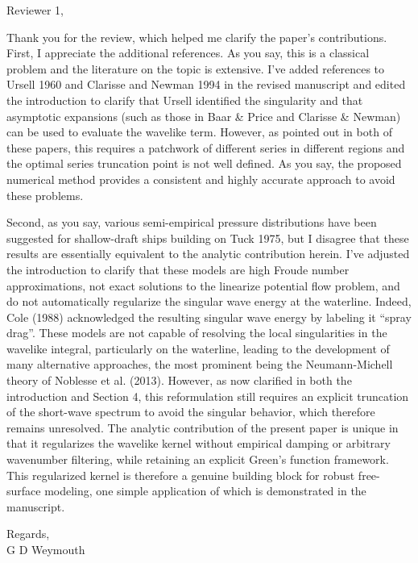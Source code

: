 \documentclass[12pt]{letter}
\begin{document}
Reviewer 1, 

Thank you for the review, which helped me clarify the paper's contributions. First, I appreciate the additional references. As you say, this is a classical problem and the literature on the topic is extensive. I've added references to Ursell 1960 and Clarisse and Newman 1994 in the revised manuscript and edited the introduction to clarify that Ursell identified the singularity and that asymptotic expansions (such as those in Baar \& Price and Clarisse \& Newman) can be used to evaluate the wavelike term. However, as pointed out in both of these papers, this requires a patchwork of different series in different regions and the optimal series truncation point is not well defined. As you say, the proposed numerical method provides a consistent and highly accurate approach to avoid these problems. 

Second, as you say, various semi-empirical pressure distributions have been suggested for shallow-draft ships building on Tuck 1975, but I disagree that these results are essentially equivalent to the analytic contribution herein. I've adjusted the introduction to clarify that these models are high Froude number approximations, not exact solutions to the linearize potential flow problem, and do not automatically regularize the singular wave energy at the waterline. Indeed, Cole (1988) acknowledged the resulting singular wave energy by labeling it ``spray drag''. These models are not capable of resolving the local singularities in the wavelike integral, particularly on the waterline, leading to the development of many alternative approaches, the most prominent being the Neumann-Michell theory of Noblesse et al. (2013). However, as now clarified in both the introduction and Section 4, this reformulation still requires an explicit truncation of the short-wave spectrum to avoid the singular behavior, which therefore remains unresolved. The analytic contribution of the present paper is unique in that it regularizes the wavelike kernel without empirical damping or arbitrary wavenumber filtering, while retaining an explicit Green's function framework. This regularized kernel is therefore a genuine building block for robust free-surface modeling, one simple application of which is demonstrated in the manuscript.

Regards,\\
G D Weymouth
\end{document}
